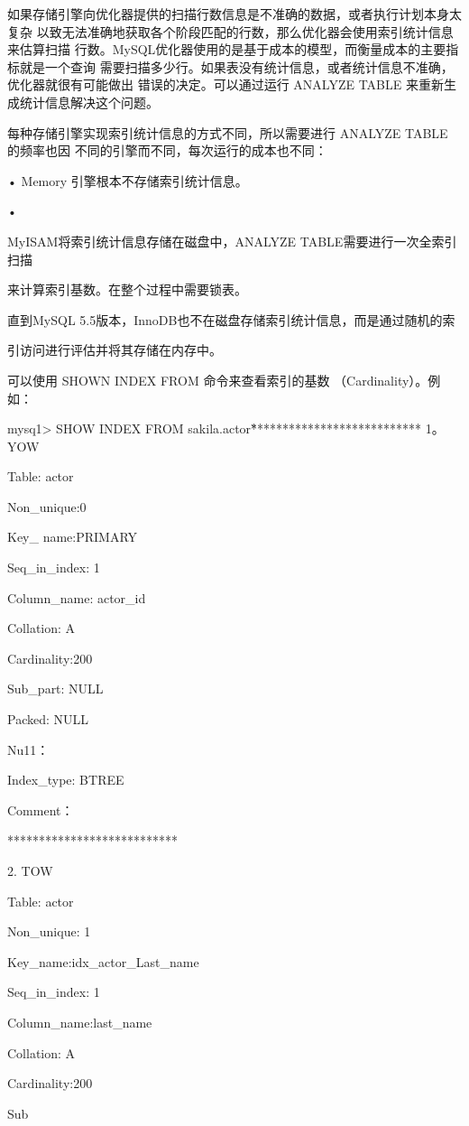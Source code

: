 如果存储引擎向优化器提供的扫描行数信息是不准确的数据，或者执行计划本身太复杂
以致无法准确地获取各个阶段匹配的行数，那么优化器会使用索引统计信息来估算扫描
行数。MySQL优化器使用的是基于成本的模型，而衡量成本的主要指标就是一个查询
需要扫描多少行。如果表没有统计信息，或者统计信息不准确，优化器就很有可能做出
错误的决定。可以通过运行 ANALYZE TABLE 来重新生成统计信息解决这个问题。

每种存储引擎实现索引统计信息的方式不同，所以需要进行 ANALYZE TABLE 的频率也因
不同的引擎而不同，每次运行的成本也不同：

• Memory 引擎根本不存储索引统计信息。

•

MyISAM将索引统计信息存储在磁盘中，ANALYZE TABLE需要进行一次全索引扫描

来计算索引基数。在整个过程中需要锁表。

直到MySQL 5.5版本，InnoDB也不在磁盘存储索引统计信息，而是通过随机的索

引访问进行评估并将其存储在内存中。

可以使用 SHOWN INDEX FROM 命令来查看索引的基数 （Cardinality）。例如：

mysq1> SHOW INDEX FROM sakila.actor\G

*************************** 1。YOW

Table: actor

Non\_unique:0

Key\_ name:PRIMARY

Seq\_in\_index: 1

Column\_name: actor\_id

Collation: A

Cardinality:200

Sub\_part: NULL

Packed: NULL

Nu11：

Index\_type: BTREE

Comment：

***************************

2. TOW

Table: actor

Non\_unique: 1

Key\_name:idx\_actor\_Last\_name

Seq\_in\_index: 1

Column\_name:last\_name

Collation: A

Cardinality:200

Sub

